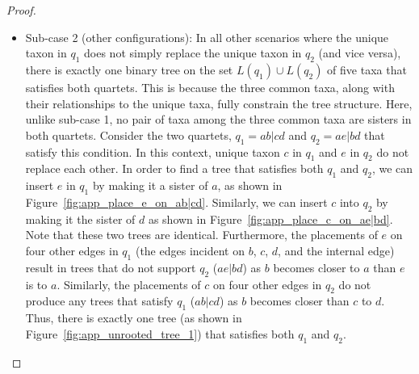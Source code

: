 \documentclass[runningheads]{llncs}
\begin{document}
\begin{appendices}
\begin{proof}
\begin{itemize}
\begin{itemize}
Let us now consider the two additional cases where taxon $e$ is placed on the other two branches of the quartet $ab|cd$. First, if taxon $e$ is placed as the sister taxon to $a$, one of the resulting induced quartets is $ae|bc$, which does not satisfy $ab|ce$ as $e$  is now the sister to $a$. Similarly, if $e$ is placed as the sister to $b$, the quartet $ac|be$ is formed, which also is not consistent with $ab|ce$. Thus, there are exactly three trees on $\{a,b,c,d,e\}$ that satisfy both $q_1$ and $q_2$.
\begin{figure}[h]
    \centering
    \begin{subfigure}{0.45\textwidth}
        \centering
        \caption{Placements of $e$ on the quartet $ab|cd$}
        \label{fig:app_place_e}
    \end{subfigure}
    \hfill %
    \begin{subfigure}{0.45\textwidth}
        \centering
        \caption{Placements of $d$ on the quartet $ab|ce$}
        \label{fig:app_place_d}
    \end{subfigure}
    \caption{Placements for $e$ and $d$ on $q_1$ and $q_2$ respectively.}
    \label{fig:app_place_both}
\end{figure}

\item Sub-case 2 (other configurations): In all other scenarios where the unique taxon in $q_1$ does not simply replace the unique taxon in $q_2$ (and vice versa), there is exactly one binary tree on the set $L(q_1)\cup L(q_2)$ of five taxa that satisfies both quartets. This is because the three common taxa, along with their relationships to the unique taxa, fully constrain the tree structure. Here, unlike sub-case 1, no pair of taxa among the three common taxa are sisters in both quartets. Consider the two quartets, $q_1 = ab|cd$ and $q_2 =  ae|bd$ %
that satisfy this condition. In this context, unique taxon $c$ in $q_1$ and $e$ in $q_2$ do not replace each other. In order to find a tree that satisfies both $q_1$ and $q_2$, we can insert $e$ in $q_1$ by making it a sister of $a$, as shown in Figure~\ref{fig:app_place_e_on_ab|cd}. Similarly, we can insert $c$ into $q_2$ by making it the sister of $d$ as shown in Figure~\ref{fig:app_place_c_on_ae|bd}. Note that these two trees are identical. Furthermore, the placements of $e$ on four other edges in $q_1$ (the edges incident on $b$, $c$, $d$, and the internal edge) result in trees that do not support $q_2$ ($ae|bd$) as $b$ becomes closer to $a$ than $e$ is to $a$. Similarly, the placements of $c$ on four other edges in $q_2$ do not produce any trees that satisfy $q_1$ ($ab|cd$) as  $b$ becomes closer than $c$ to $d$. Thus, there is exactly one tree (as shown in Figure~\ref{fig:app_unrooted_tree_1}) that satisfies both $q_1$ and $q_2$.


\end{itemize}
\end{itemize}
\end{proof}
\end{appendices}
\end{document}
